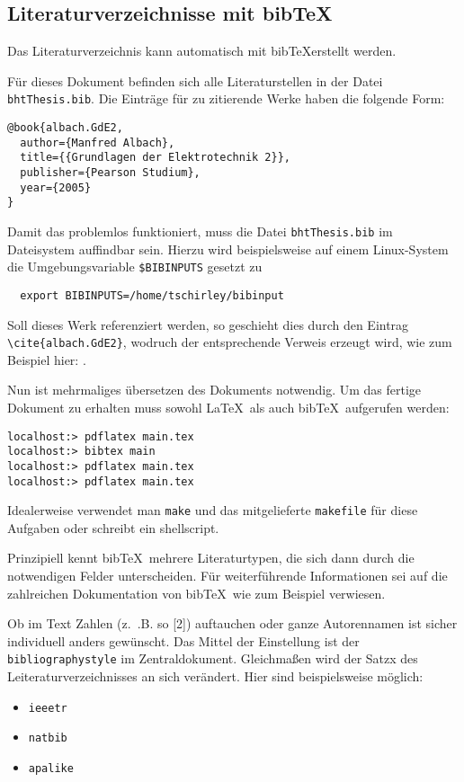 \subsection{Literaturverzeichnisse mit bib\TeX}
Das Literaturverzeichnis kann automatisch mit bib\TeX erstellt werden. 

Für   dieses  Dokument   befinden   sich  alle   Literaturstellen   in  der   Datei
\texttt{bhtThesis.bib}.  Die Einträge für  zu zitierende  Werke haben  die folgende
Form:
 \begin{lstlisting}
@book{albach.GdE2,
  author={Manfred Albach},
  title={{Grundlagen der Elektrotechnik 2}},
  publisher={Pearson Studium},
  year={2005}
}
 \end{lstlisting}

Damit das problemlos funktioniert, muss die Datei \texttt{bhtThesis.bib} im
Dateisystem auffindbar sein. Hierzu wird beispielsweise auf einem Linux-System die
Umgebungsvariable \texttt{\$BIBINPUTS} gesetzt zu
\begin{lstlisting}
  export BIBINPUTS=/home/tschirley/bibinput
\end{lstlisting}

Soll  dieses  Werk  referenziert  werden,  so  geschieht  dies  durch  den  Eintrag
\verb|\cite{albach.GdE2}|, wodruch der entsprechende  Verweis erzeugt wird, wie zum
Beispiel hier: \cite{albach.GdE2}.

Nun ist mehrmaliges übersetzen des  Dokuments notwendig. Um das fertige Dokument zu
erhalten muss sowohl \LaTeX\ als auch bib\TeX\ aufgerufen werden:
\begin{lstlisting}
localhost:> pdflatex main.tex
localhost:> bibtex main
localhost:> pdflatex main.tex
localhost:> pdflatex main.tex
\end{lstlisting}
Idealerweise  verwendet man \texttt{make}  und das  mitgelieferte \texttt{makefile}
für diese Aufgaben oder schreibt ein shellscript.

Prinzipiell  kennt  bib\TeX\  mehrere  Literaturtypen,  die  sich  dann  durch  die
notwendigen  Felder unterscheiden.   Für weiterführende  Informationen sei  auf die
zahlreichen  Dokumentation  von  bib\TeX\  wie  zum  Beispiel  \cite{bibTeX.manual}
verwiesen.

Ob im Text Zahlen (z.~.B. so [2]) auftauchen oder ganze Autorennamen ist sicher
individuell anders gewünscht. Das Mittel der Einstellung ist der
\texttt{bibliographystyle} im Zentraldokument. Gleichmaßen wird der Satzx des
Leiteraturverzeichnisses an sich verändert. Hier sind beispielsweise möglich:
\begin{itemize}
\item \texttt{ieeetr}
\item \texttt{natbib}
\item \texttt{apalike}
\end{itemize}

